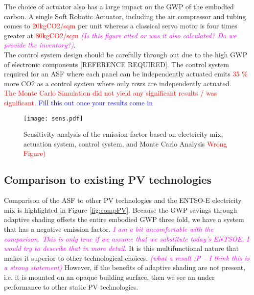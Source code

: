 The choice of actuator also has a large impact on the GWP of the embodied carbon. A single Soft Robotic Actuator, including the air compressor and tubing comes to \textcolor{red}{20kgCO2/sqm} per unit whereas a classical servo motor is four times greater at \textcolor{red}{80kgCO2/sqm} \textcolor{magenta}{\textit{(Is this figure cited or was it also calculated? Do we provide the inventory?)}}.\\

The control system design should be carefully through out due to the high GWP of electronic components [REFERENCE REQUIRED]. The control system required for an ASF where each panel can be independently actuated emits \textcolor{red}{35 \%} more CO2 as a control system where only rows are independently actuated.\\

\textcolor{red}{The Monte Carlo Simulation did not yield any significant results / was significant. } \textcolor{blue}{Fill this out once your results come in}




\begin{figure}[H]
\begin{center}
\texttt{[image: sens.pdf]}
\caption{Sensitivity analysis of the emission factor based on electricity mix, actuation system, control system, and Monte Carlo Analysis \textcolor{red}{Wrong Figure)}}
\label{fig:sens}
\end{center}
\end{figure}



\subsection{Comparison to existing PV technologies}

Comparison of the ASF to other PV technologies and the ENTSO-E electricity mix is highlighted in Figure \ref{fig:compPV}. Because the GWP savings through adaptive shading offsets the entire embodied GWP three fold, we have a system that has a negative emission factor. \textcolor{magenta}{\textit{I am a bit uncomfortable with the comparison. This is only true if we assume that we substitute today's ENTSOE. I would try to describe that in more detail.}} It is this multifunctional nature that makes it superior to other technological choices. \textcolor{magenta}{\textit{(what a result ;P -- I think this is a strong statement)}} However, if the benefits of adaptive shading are not present, i.e. it is mounted on an opaque building surface, then we see an under performance to other static PV technologies. 

